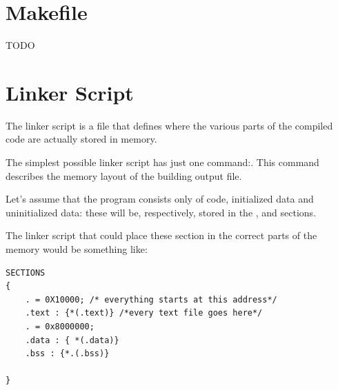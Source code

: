 \section{Makefile}
TODO

\section{Linker Script}
The linker script is a file that defines where the various parts of the compiled code are actually stored in memory.

The simplest possible linker script has just one command:\code[SECTIONS]. This command describes the memory layout of the building output file.

Let's assume that the program consists only of code, initialized data and uninitialized data: these will be, respectively, stored in the \code[.text],  and  sections.

The linker script that could place these section in the correct parts of the memory would be something like:

\begin{lstlisting}
SECTIONS
{
	. = 0X10000; /* everything starts at this address*/
	.text : {*(.text)} /*every text file goes here*/ 
	. = 0x8000000;
	.data : { *(.data)}
	.bss : {*.(.bss)}

}

\end{lstlisting}


%	

